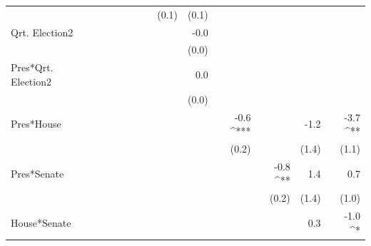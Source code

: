 \documentclass[a4paper]{article}\usepackage{graphicx, color}
\begin{document}
\begin{table}[ht]
\begin{center}
{\begin{tabular}{ l D{.}{.}{1}D{.}{.}{1}D{.}{.}{1}D{.}{.}{1}D{.}{.}{1}D{.}{.}{1}D{.}{.}{1}D{.}{.}{1}D{.}{.}{1}D{.}{.}{1}D{.}{.}{1}D{.}{.}{1} }
                     &                 &                 &                 &                 &                 &                 & (0.1)           & (0.1)           &                 &                 &                 &                \\ 
Qrt. Election2       &                 &                 &                 &                 &                 &                 &                 & -0.0            &                 &                 &                 &                \\ 
                     &                 &                 &                 &                 &                 &                 &                 & (0.0)           &                 &                 &                 &                \\ 
Pres*Qrt. Election2  &                 &                 &                 &                 &                 &                 &                 & 0.0             &                 &                 &                 &                \\ 
                     &                 &                 &                 &                 &                 &                 &                 & (0.0)           &                 &                 &                 &                \\ 
Pres*House           &                 &                 &                 &                 &                 &                 &                 &                 & -0.6 ^{***}     &                 & -1.2            & -3.7 ^{**}     \\ 
                     &                 &                 &                 &                 &                 &                 &                 &                 & (0.2)           &                 & (1.4)           & (1.1)          \\ 
Pres*Senate          &                 &                 &                 &                 &                 &                 &                 &                 &                 & -0.8 ^{**}      & 1.4             & 0.7            \\ 
                     &                 &                 &                 &                 &                 &                 &                 &                 &                 & (0.2)           & (1.4)           & (1.0)          \\ 
House*Senate         &                 &                 &                 &                 &                 &                 &                 &                 &                 &                 & 0.3             & -1.0 ^*        \\ 

\end{tabular}}
\end{center}
\end{table}
\end{document}
